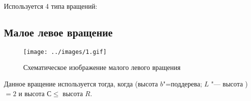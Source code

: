 \begin{frame}
    Используется 4 типа вращений:

    \subsection*{Малое левое вращение}

    \begin{figure}[ht]
        \texttt{[image: ../images/1.gif]}
        
        \caption{Схематическое изображение малого левого вращения}    
    \end{figure}

    Данное вращение используется тогда,
    когда (высота $b$"=поддерева; $L$ "--- высота )
    $= 2$ и высота $С \leqslant$ высота $R$.

\end{frame}